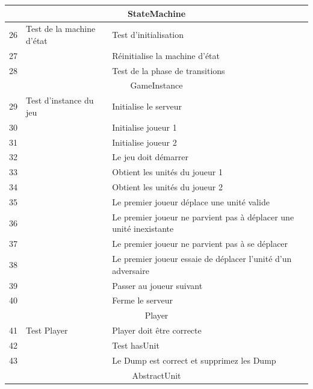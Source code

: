 \begin{center}
\begin{tabular}{|l|l|l|}
  
  
 \hline
\end{tabular}


\begin{tabular}{|l|l|l|}

    \hline
    \multicolumn{3}{|c|}{StateMachine} \\
    \hline
    
    26 & Test de la machine d'état & Test d'initialisation\\
    27 && Réinitialise la machine d'état \\
    28 && Test  de la phase de transitions \\
    
    
    
    
    \hline
    \multicolumn{3}{c}{GameInstance}\\
    \hline
    29 & Test d'instance du jeu & Initialise le serveur\\
    30 && Initialise joueur  1 \\
    31 && Initialise joueur 2 \\
    32 && Le jeu doit démarrer\\
    33 && Obtient les unités du joueur 1 \\
    34 && Obtient les unités du joueur 2 \\
    35 && Le premier joueur déplace une unité valide \\
    36 && Le premier joueur ne parvient pas à déplacer une unité inexistante \\
    37 && Le premier joueur ne parvient pas à se déplacer \\ %
    38 && Le premier joueur essaie de déplacer l'unité d'un adversaire\\
    39 && Passer au joueur suivant \\
    40 && Ferme le serveur \\
    
    
    \hline
    \multicolumn{3}{c}{Player}\\
     \hline
     41 & Test Player & Player doit être correcte\\
     42 && Test hasUnit \\
     43 && Le Dump est correct et supprimez les Dump \\

     
     \hline
     \multicolumn{3}{c}{AbstractUnit}\\
     \hline
     

\end{tabular}
\end{center}

